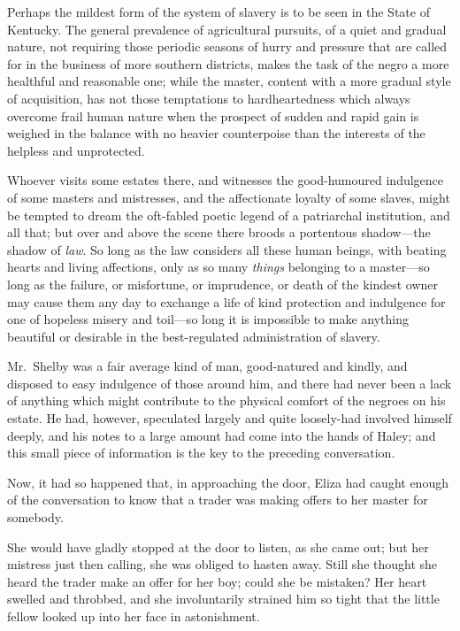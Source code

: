Perhaps the mildest form of the system of slavery is to be seen in the State of
Kentucky. The general prevalence of agricultural pursuits, of a quiet and
gradual nature, not requiring those periodic seasons of hurry and pressure that
are called for in the business of more southern districts, makes the task of the
negro a more healthful and reasonable one; while the master, content with a more
gradual style of acquisition, has not those temptations to hardheartedness which
always overcome frail human nature when the prospect of sudden and rapid gain is
weighed in the balance with no heavier counterpoise than the interests of the
helpless and unprotected.

Whoever visits some estates there, and witnesses the good-humoured indulgence of
some masters and mistresses, and the affectionate loyalty of some slaves, might
be tempted to dream the oft-fabled poetic legend of a patriarchal institution,
and all that; but over and above the scene there broods a portentous
shadow---the shadow of \emph{law}. So long as the law considers all these human
beings, with beating hearts and living affections, only as so many \emph{things}
belonging to a master---so long as the failure, or misfortune, or imprudence, or
death of the kindest owner may cause them any day to exchange a life of kind
protection and indulgence for one of hopeless misery and toil---so long it is
impossible to make anything beautiful or desirable in the best-regulated
administration of slavery.

Mr.\ Shelby was a fair average kind of man, good-natured and kindly, and
disposed to easy indulgence of those around him, and there had never been a lack
of anything which might contribute to the physical comfort of the negroes on his
estate. He had, however, speculated largely and quite loosely-had involved
himself deeply, and his notes to a large amount had come into the hands of
Haley; and this small piece of information is the key to the preceding
conversation.

Now, it had so happened that, in approaching the door, Eliza had caught enough
of the conversation to know that a trader was making offers to her master for
somebody.

She would have gladly stopped at the door to listen, as she came out; but her
mistress just then calling, she was obliged to hasten away. Still she thought
she heard the trader make an offer for her boy; could she be mistaken? Her heart
swelled and throbbed, and she involuntarily strained him so tight that the
little fellow looked up into her face in astonishment.

